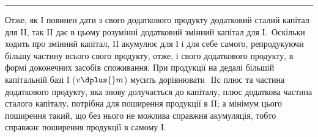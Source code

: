 \pfbreak

Отже, як І повинен дати з свого додаткового продукту додатковий
сталий капітал для II, так II дає в цьому розумінні додатковий змінний
капітал для І.~Оскільки ходить про змінний капітал, II акумулює для І і
для себе самого, репродукуючи більшу частину всього свого продукту,
отже, і свого додаткового продукту, в формі доконечних засобів споживання.
При продукції на дедалі більшій капітальній базі І ($v \dplus{} m$) мусить
дорівнювати $\text{ II} с$ плюс та частина додаткового продукту, яка знову долучається
до капіталу, плюс додаткова частина сталого капіталу, потрібна
для поширення продукції в II; а мінімум цього поширення такий, що
без нього не можлива справжня акумуляція, тобто справжнє поширення
продукції в самому І.
